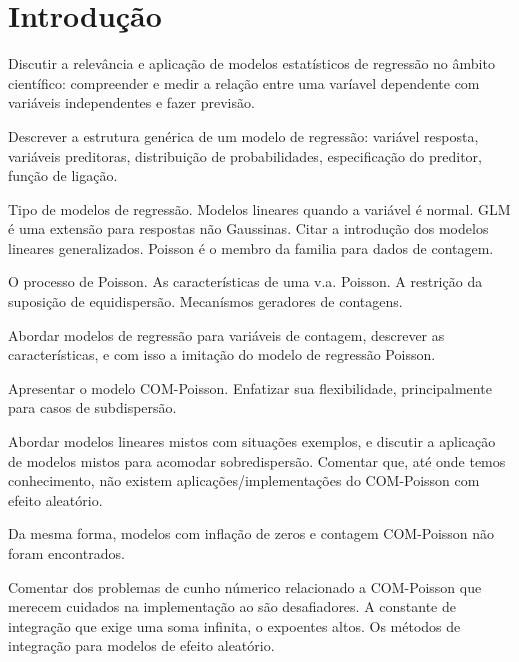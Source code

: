 \documentclass[
	12pt,				%
	openright,			%
	oneside,			%
	a4paper,			%
	english,			%
	brazil,				%
	]{abntex2}
\begin{document}

\imprimirfolhaderosto

\tableofcontents*
\cleardoublepage


\textual

\chapter{Introdução}

Discutir a relevância e aplicação de modelos estatísticos de regressão
no âmbito científico: compreender e medir a relação entre uma varíavel
dependente com variáveis independentes e fazer previsão.

Descrever a estrutura genérica de um modelo de regressão: variável
resposta, variáveis preditoras, distribuição de probabilidades,
especificação do preditor, função de ligação.

Tipo de modelos de regressão. Modelos lineares quando a variável é
normal. GLM é uma extensão para respostas não Gaussinas.  Citar a
introdução dos modelos lineares generalizados.  Poisson é o membro da
familia para dados de contagem.

O processo de Poisson. As características de uma v.a. Poisson. A
restrição da suposição de equidispersão. Mecanísmos geradores de
contagens.

Abordar modelos de regressão para variáveis de contagem, descrever as
características, e com isso a imitação do modelo de regressão Poisson.

Apresentar o modelo COM-Poisson. Enfatizar sua flexibilidade,
principalmente para casos de subdispersão.

Abordar modelos lineares mistos com situações exemplos, e discutir a
aplicação de modelos mistos para acomodar sobredispersão. Comentar que,
até onde temos conhecimento, não existem aplicações/implementações do
COM-Poisson com efeito aleatório.

Da mesma forma, modelos com inflação de zeros e contagem COM-Poisson não
foram encontrados.

Comentar dos problemas de cunho númerico relacionado a COM-Poisson que
merecem cuidados na implementação ao são desafiadores. A constante de
integração que exige uma soma infinita, o expoentes altos. Os métodos de
integração para modelos de efeito aleatório.
\end{document}
